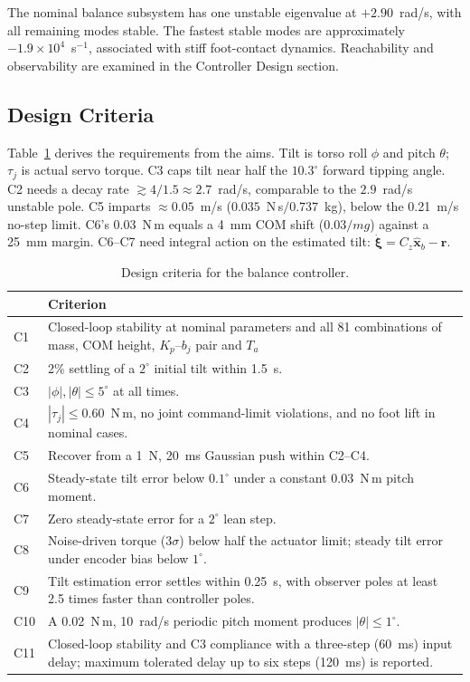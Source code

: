 \documentclass[conference,a4paper]{IEEEtran}
\begin{document}
The nominal balance subsystem has one unstable eigenvalue at $+2.90$~rad/s, with all remaining modes stable. The fastest stable modes are approximately $-1.9\times10^4$~s$^{-1}$, associated with stiff foot-contact dynamics. Reachability and observability are examined in the Controller Design section.

\subsection{Design Criteria}
Table~\ref{tab:criteria} derives the requirements from the aims. Tilt is torso roll $\phi$ and pitch $\theta$; $\tau_j$ is actual servo torque. C3 caps tilt near half the $10.3^\circ$ forward tipping angle. C2 needs a decay rate $\gtrsim4/1.5\approx2.7$~rad/s, comparable to the $2.9$~rad/s unstable pole. C5 imparts $\approx0.05$~m/s ($0.035$~N\,s$/0.737$~kg), below the 0.21~m/s no-step limit. C6's $0.03$~N\,m equals a 4~mm COM shift ($0.03/mg$) against a 25~mm margin. C6--C7 need integral action on the estimated tilt: $\dot{\boldsymbol{\xi}}=C_z\hat{\mathbf{x}}_b-\mathbf{r}.$


\begin{table}[H]
\centering
\caption{Design criteria for the balance controller.}
\label{tab:criteria}
\footnotesize
\setlength{\tabcolsep}{3pt}
\begin{tabular}{@{}l p{5.9cm}@{}}
\hline
 & Criterion \\
\hline
C1 & Closed-loop stability at nominal parameters and all 81 combinations of mass, COM height, $K_p$--$b_j$ pair and $T_a$\\
C2 & 2\% settling of a $2^\circ$ initial tilt within 1.5~s.\\
C3 & $|\phi|,|\theta|\leq5^\circ$ at all times.\\
C4 & $|\tau_j|\leq0.60$~N\,m, no joint command-limit violations, and no foot lift in nominal cases.\\
C5 & Recover from a 1~N, 20~ms Gaussian push within C2--C4.\\
C6 & Steady-state tilt error below $0.1^\circ$ under a constant 0.03~N\,m pitch moment.\\
C7 & Zero steady-state error for a $2^\circ$ lean step.\\
C8 & Noise-driven torque ($3\sigma$) below half the actuator limit; steady tilt error under encoder bias below $1^\circ$.\\
C9 & Tilt estimation error settles within 0.25~s, with observer poles at least 2.5 times faster than controller poles.\\
C10 & A 0.02~N\,m, 10~rad/s periodic pitch moment produces $|\theta|\leq1^\circ$.\\
C11 & Closed-loop stability and C3 compliance with a three-step (60~ms) input delay; maximum tolerated delay up to six steps (120~ms) is reported.\\
\hline
\end{tabular}
\end{table}
\end{document}
